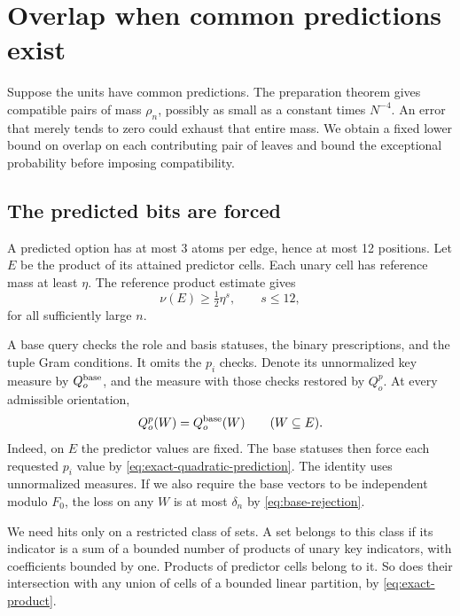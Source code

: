 \section{Overlap when common predictions exist}\label{sec:rare-overlap}

Suppose the units have common predictions. The preparation theorem
gives compatible pairs of mass \(\rho_n\), possibly as small as a
constant times \(N^{-4}\). An error that merely tends to zero could
exhaust that entire mass. We obtain a fixed lower bound on overlap
on each contributing pair of leaves and bound the exceptional
probability before imposing compatibility.

\subsection{The predicted bits are forced}

A predicted option has at most 3 atoms per edge, hence at most 12
positions. Let \(E\) be the product of its attained predictor cells.
Each unary cell has reference mass at least \(\eta\). The reference
product estimate gives
\begin{equation}\label{eq:predicted-cell-mass}
 \nu(E)\ge\tfrac12\eta^s,\qquad s\le12,
\end{equation}
for all sufficiently large \(n\).

A base query checks the role and basis statuses, the binary prescriptions,
and the tuple Gram conditions. It omits the \(p_i\) checks. Denote its
unnormalized key measure by \(Q_o^{\rm base}\), and the measure with those
checks restored by \(Q_o^p\). At every admissible orientation,
\begin{equation}\label{eq:predicted-error}
 Q_o^p(W)=Q_o^{\rm base}(W)
 \qquad(W\subseteq E).
\end{equation}
Indeed, on \(E\) the predictor values are fixed. The base statuses then
force each requested \(p_i\) value by
\eqref{eq:exact-quadratic-prediction}.
The identity uses unnormalized measures. If we also require the base
vectors to be independent modulo \(F_0\), the loss on any \(W\) is at
most \(\delta_n\) by \eqref{eq:base-rejection}.

We need hits only on a restricted class of sets. A set belongs to this
class if its indicator is a sum of a bounded number of products of unary
key indicators, with coefficients bounded by one. Products of predictor
cells belong to it. So does their intersection with any union of cells
of a bounded linear partition, by \eqref{eq:exact-product}.


